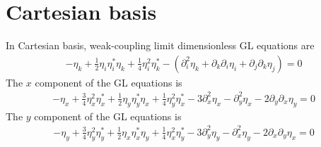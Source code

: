 \documentclass[aps,prl,preprint]{revtex4-2}
\begin{document}
\section{Cartesian basis}

In Cartesian basis, weak-coupling limit dimensionless GL equations are
\begin{align}
    -\eta_k+\frac{1}{2}\eta_i\eta_i^*\eta_k
    +\frac{1}{4}\eta_i^2\eta_k^*-\left(\partial_i^2\eta_k
    +\partial_k\partial_i\eta_i
    +\partial_j\partial_k\eta_j\right) = 0
\end{align}
The $x$ component of the GL equations is
\begin{align}
    -\eta_x+\frac{3}{4}\eta_x^2\eta_x^*
    +\frac{1}{2}\eta_y\eta_y^*\eta_x
    +\frac{1}{4}\eta_y^2\eta_x^*
    -3\partial_x^2\eta_x - \partial_y^2\eta_x
    -2\partial_y\partial_x\eta_y = 0
\end{align}
The $y$ component of the GL equations is
\begin{align}
    -\eta_y+\frac{3}{4}\eta_y^2\eta_y^*
    +\frac{1}{2}\eta_x\eta_x^*\eta_y
    +\frac{1}{4}\eta_x^2\eta_y^*
    -3\partial_y^2\eta_y - \partial_x^2\eta_y
    -2\partial_x\partial_y\eta_x = 0
\end{align}
\end{document}
